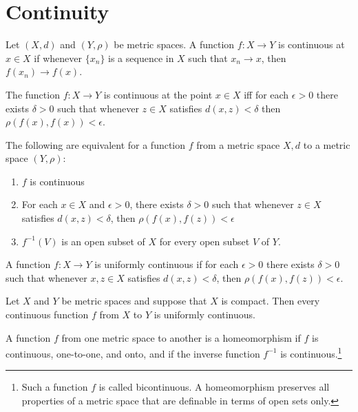 \documentclass[nobib,notoc]{tufte-handout}
\begin{document}
\section{Continuity}
\begin{defi}
	Let \((X,d)\) and \((Y,\rho)\) be metric spaces. A function \(f:X\rightarrow Y\) is continuous at \(x\in X\) if whenever \(\{x_n\}\) is a sequence in \(X\) such that \(x_n\rightarrow x\), then \(f(x_n)\rightarrow f(x)\).
\end{defi}
\begin{thm}
	The function \(f:X\rightarrow Y\) is continuous at the point \(x\in X\) iff for each \(\epsilon>0\) there exists \(\delta>0\) such that whenever \(z\in X\) satisfies \(d(x,z)<\delta\) then \(\rho(f(x),f(x))<\epsilon\).
\end{thm}
\begin{thm}
	The following are equivalent for a function \(f\) from a metric space \(X,d\) to a metric space \((Y,\rho)\):
	\begin{enumerate}
		\item \(f\) is continuous
		\item For each \(x\in X\) and \(\epsilon>0\), there exists \(\delta>0\) such that whenever \(z\in X\) satisfies \(d(x,z)<\delta\), then \(\rho(f(x),f(z))<\epsilon\)
		\item \(f^{-1}(V)\) is an open subset of \(X\) for every open subset \(V\) of \(Y\).
	\end{enumerate}
\end{thm}
\begin{defi}
	A function \(f:X\rightarrow Y\) is uniformly continuous if for each \(\epsilon>0\) there exists \(\delta>0\) such that whenever \(x,z\in X\) satisfies \(d(x,z)<\delta\), then \(\rho(f(x),f(z))<\epsilon\).
\end{defi}
\begin{thm}
	Let \(X\) and \(Y\) be metric spaces and suppose that \(X\) is compact. Then every continuous function \(f\) from \(X\) to \(Y\) is uniformly continuous.
\end{thm}
\begin{defi}[Homeomorphism]
	A function \(f\) from one metric space to another is a homeomorphism if \(f\) is continuous, one-to-one, and onto, and if the inverse function \(f^{-1}\) is continuous.\footnote{Such a function \(f\) is called bicontinuous. A homeomorphism preserves all properties of a metric space that are definable in terms of open sets only.}
\end{defi}
\clearpage
\end{document}
